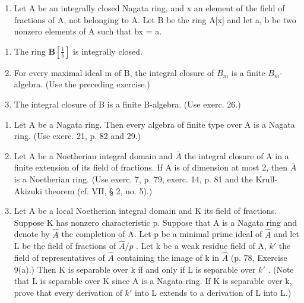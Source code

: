 \begin{enumerate}
\def\labelenumi{\arabic{enumi})}
\setcounter{enumi}{28}
\tightlist
\item
  Let A be an integrally closed Nagata ring, and x an element of the field of fractions of A, not belonging to A. Let B be the ring A{[}x{]} and let a, b be two nonzero elements of A such that bx = a.
\end{enumerate}

\begin{enumerate}
\def\labelenumi{\alph{enumi})}
\item
  The ring \(\mathbf{B}\left[\frac{1}{b}\right]\) is integrally closed.
\item
  For every maximal ideal m of B, the integral closure of \(B_{m}\) is a finite \(B_{m}\)-algebra. (Use the preceding exercise.)
\item
  The integral closure of B is a finite B-algebra. (Use exerc. 26.)
\end{enumerate}

\begin{enumerate}
\def\labelenumi{\arabic{enumi})}
\setcounter{enumi}{29}
\item
  Let A be a Nagata ring. Then every algebra of finite type over A is a Nagata ring. (Use exerc. 21, p. 82 and 29.)
\item
  Let A be a Noetherian integral domain and \(\overline{A}\) the integral closure of A in a finite extension of its field of fractions. If A is of dimension at most 2, then \(\overline{A}\) is a Noetherian ring. (Use exerc. 7, p. 79, exerc. 14, p. 81 and the Krull-Akizuki theorem (cf. VII, § 2, no. 5).)
\item
  Let A be a local Noetherian integral domain and K its field of fractions. Suppose K has nonzero characteristic p. Suppose that A is a Nagata ring and denote by \(\hat{A}\) the completion of A. Let p be a minimal prime ideal of \(\hat{A}\) and let L be the field of fractions of \(\hat{A}/p\) . Let k be a weak residue field of A, \(k'\) the field of representatives of \(\hat{A}\) containing the image of k in \(\hat{A}\) (p. 78, Exercise 9(a).) Then K is separable over k if and only if L is separable over \(k'\) . (Note that L is separable over K since A is a Nagata ring. If K is separable over k, prove that every derivation of \(k'\) into L extends to a derivation of L into L.)
\end{enumerate}

